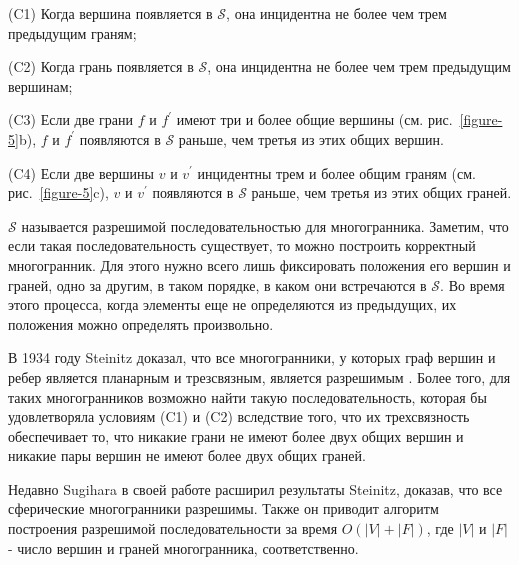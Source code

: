 \documentclass[a4paper,12pt, titlepage]{article}
\begin{document}
\begin{flushleft}
 (C1) Когда вершина появляется в $\mathcal{S}$, она инцидентна не более чем трем предыдущим 
граням;
\end{flushleft}
\begin{flushleft}
 (C2) Когда грань появляется в $\mathcal{S}$, она инцидентна не более чем трем предыдущим 
вершинам;
\end{flushleft}
\begin{flushleft}
 (C3) Если две грани $f$ и $f^{'}$ имеют три и более общие вершины (см. рис.~\ref{figure-5}b), 
$f$ и $f^{'}$ появляются в $\mathcal{S}$ раньше, чем третья из этих общих вершин.
\end{flushleft}
\begin{flushleft}
 (C4) Если две вершины $v$ и $v^{'}$ инцидентны трем и более общим граням (см. рис.~\ref{figure-5}c), 
$v$ и $v^{'}$ появляются в $\mathcal{S}$ раньше, чем третья из этих общих граней.
\end{flushleft}

\begin{flushleft}
      $\mathcal{S}$ называется разрешимой последовательностью для многогранника. Заметим,
что если такая последовательность существует, то можно построить корректный многогранник. Для этого 
нужно всего лишь фиксировать положения его вершин и граней, одно за другим, в таком порядке,
в каком они встречаются в $\mathcal{S}$. Во время этого процесса, когда элементы еще не
определяются из предыдущих, их положения можно определять произвольно.
\end{flushleft}

\begin{flushleft}
      В 1934 году Steinitz доказал, что все многогранники, у которых граф вершин и ребер является
планарным и трезсвязным, является разрешимым \cite{Whiteley-3}. Более того, для таких многогранников
возможно найти такую последовательность, которая бы удовлетворяла условиям (C1) и (C2) вследствие того,
что их трехсвязность обеспечивает то, что никакие грани не имеют более двух общих вершин и никакие 
пары вершин не имеют более двух общих граней.
\end{flushleft}

\begin{flushleft}
      Недавно Sugihara в своей работе \cite{Sugihara-RRP} расширил результаты Steinitz, доказав,
что все сферические многогранники разрешимы. Также он приводит алгоритм построения
разрешимой последовательности за время $O(|V| + |F|)$, где $|V|$ и $|F|$ - число вершин и граней
многогранника, соответственно.
\end{flushleft}
\end{document}
